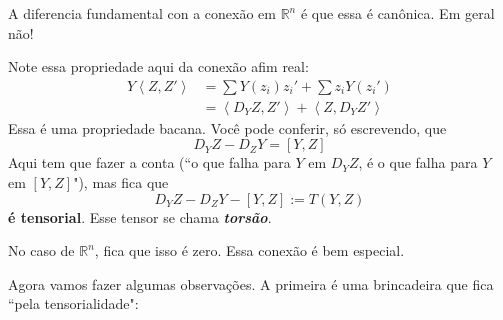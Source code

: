 A diferencia fundamental con a conexão em \(\mathbb{R}^n\) é que essa é canônica. Em geral não!

Note essa propriedade aqui da conexão afim real:
\begin{align*}
Y\left<Z,Z'\right>&=\sum Y(z_i)z_i'+\sum z_i Y(z_i')\\
&=\left<D_YZ,Z'\right>+\left<Z,D_YZ'\right>
\end{align*}
Essa é uma propriedade bacana. Você pode conferir, só escrevendo, que
\[D_YZ-D_ZY=[Y,Z]\]
Aqui tem que fazer a conta (``o que falha para \(Y\) em  \(D_YZ\),  é o que falha para \(Y\) em \([Y,Z]\)"), mas fica que
\[D_YZ-D_ZY-[Y,Z]:=T(Y,Z)\]
\textbf{é tensorial}. Esse tensor se chama \textit{\textbf{torsão}}.

No caso de \(\mathbb{R}^n\), fica que isso é zero. Essa conexão é bem especial.

Agora vamos fazer algumas observações. A primeira é uma brincadeira que fica ``pela tensorialidade":

